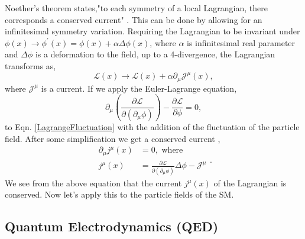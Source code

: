  Noether's theorem states,"to each symmetry of a local Lagrangian, there corresponds a conserved current" \cite{peskin_introduction_1995}. This can be done by allowing for an infinitesimal symmetry variation. Requiring the Lagrangian to be invariant under $\phi(x)\rightarrow\phi^\prime(x)=\phi(x)+\alpha\Delta\phi(x)$, where $\alpha$ is infinitesimal real parameter and $\Delta\phi$ is a deformation to the field, up to a 4-divergence, the Lagrangian transforms as,
 \begin{equation}\label{LagrangeFluctuation}
 \mathcal{L}(x)\rightarrow\mathcal{L}(x)+\alpha\partial_\mu\mathcal{J}^\mu(x),
 \end{equation}
 where $\mathcal{J}^\mu$ is a current. If we apply the Euler-Lagrange equation,
 \begin{equation}
 \partial_\mu(\frac{\partial\mathcal{L}}{\partial(\partial_\mu\phi)})-\frac{\partial\mathcal{L}}{\partial\phi}=0,
 \end{equation}
 to Eqn. \ref{LagrangeFluctuation} with the addition of the fluctuation of the particle field. After some simplification we get a conserved current \cite{halzen_quarks_1984, peskin_introduction_1995},
 \begin{equation}
 \begin{split}
 \partial_\mu j^\mu(x)&=0, \text{ where}\\
 j^\mu(x)&=\frac{\partial\mathcal{L}}{\partial(\partial_\mu\phi)}\Delta\phi-\mathcal{J}^\mu
 \end{split}.
 \end{equation} We see from the above equation that the current $j^\mu(x)$ of the Lagrangian is conserved. Now let's apply this to the particle fields of the SM.
 
 \subsection{Quantum Electrodynamics (QED)}
 
